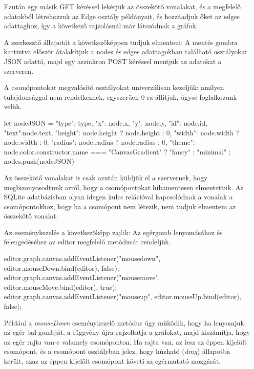 \begin{javascript}
       .then(r => {
\end{javascript}

Ezután egy másik GET kéréssel lekérjük az összekötő vonalakat, és a megfelelő adatokból létrehozzuk az Edge osztály példányait, és hozzáadjuk őket az edges adattaghoz, így a következő rajzolásnál már látszódnak a gráfok. 

A szerkesztő állapotát a következőképpen tudjuk elmenteni: A mentés gombra kattintva először átalakítjuk a nodes és edges adattagokban található osztályokat JSON adattá, majd egy aszinkron POST kéréssel mentjük az adatokat a szerveren.

A csomópontokat megvalósító osztályokat univerzálisan kezeljük: amilyen tulajdonsággal nem rendelkeznek, egyszerűen 0-ra állítjuk, úgyse foglalkozunk velük.

\begin{javascript}
       let nodeJSON = {
           "type": type,
           "x": node.x,
           "y": node.y,
           "id": node.id,
           "text":node.text,
           "height": node.height ? node.height : 0,
           "width": node.width ? node.width : 0,
           "radius": node.radius ? node.radius : 0,
           "theme": node.color.constructor.name === "CanvasGradient" ? "fancy" : "minimal"
       };
       nodes.push(nodeJSON)
\end{javascript}

Az összekötő vonalakat is csak azután küldjük el a szervernek, hogy megbizonyosodtunk arról, hogy a csomópontokat hibamentesen elmentettük. Az SQLite adatbázisban olyan idegen kulcs relációval kapcsolódnak a vonalak a csomópontokhoz, hogy ha a csomópont nem létezik, nem tudjuk elmenteni az összekötő vonalat.
 
Az eseménykezelés a következőképp zajlik: Az egérgomb lenyomásához és felengedéséhez az editor megfelelő metódusát rendeljük.

\begin{javascript}
editor.graph.canvas.addEventListener("mousedown", editor.mouseDown.bind(editor), false);
editor.graph.canvas.addEventListener("mousemove", editor.mouseMove.bind(editor), true);
editor.graph.canvas.addEventListener("mouseup", editor.mouseUp.bind(editor), false);
\end{javascript}
 
Például a \textit{mouseDown} eseménykezelő metódus úgy működik, hogy ha lenyomjuk az egér bal gombját, a függvény újra rajzoltatja a gráfokat, majd kiszámítja, hogy az egér rajta van-e valamely csomóponton. Ha rajta van, az lesz az éppen kijelölt csomópont, és a csomópont osztályban jelez, hogy húzható (\textit{drag}) állapotba került, azaz az éppen kijelölt csomópont követi az egérmutató mozgását.

